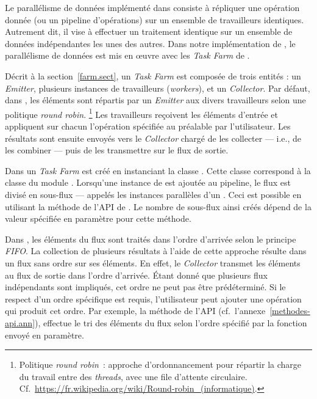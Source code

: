Le parall\'elisme de donn\'ees impl\'ement\'e dans   consiste \`a r\'epliquer une op\'eration donnée (ou un pipeline d'opérations) sur un ensemble de travailleurs identiques. Autrement dit, il vise \`a effectuer un traitement identique sur un ensemble de donn\'ees ind\'ependantes les unes des autres. 
%
Dans notre impl\'ementation de \PpFf, le parall\'elisme de donn\'ees est mis en \oe{}uvre avec les \emph{Task Farm} de .


D\'ecrit \`a la section~\ref{farm.sect}, un \emph{Task Farm} est compos\'ee de trois entit\'es : un \emph{Emitter}, plusieurs instances de travailleurs (\emph{workers}), et un \emph{Collector}. Par d\'efaut, dans \PpFf{}, les \'el\'ements sont r\'epartis par un \emph{Emitter} aux divers travailleurs selon une politique \emph{round robin}.%
%
\footnote{Politique \emph{round robin}~: approche d'ordonnancement pour r\'epartir la charge du travail entre des \emph{threads}, avec une file d'attente circulaire. Cf.~\url{https://fr.wikipedia.org/wiki/Round-robin_(informatique)}.} 
%
Les travailleurs re\c{c}oivent les \'el\'ements d'entr\'ee et appliquent sur chacun l'op\'eration sp\'ecifi\'ee au pr\'ealable par l'utilisateur. Les r\'esultats sont ensuite envoy\'es vers le \emph{Collector} charg\'e de les collecter --- i.e., de les combiner --- puis de les transmettre sur le flux de sortie.

Dans  un \emph{Task Farm} est cr\'e\'e en instanciant la classe . Cette classe correspond \`a la classe  du module . Lorsqu'une instance de  est ajout\'ee au {pipeline}, le flux est divis\'e en sous-flux --- appel\'es les instances parall\`eles d'un . Ceci est possible en utilisant la m\'ethode  de l'API de . Le nombre de sous-flux ainsi cr\'e\'es d\'epend de la valeur sp\'ecifi\'ee en param\`etre pour cette m\'ethode.  

Dans , les \'el\'ements du flux sont trait\'es dans l'ordre d'arriv\'ee selon le principe \emph{FIFO}. La collection de plusieurs r\'esultats \`a l'aide de cette approche r\'esulte dans un flux sans ordre sur ses \'el\'ements. En effet, le \emph{Collector} transmet les \'el\'ements au flux de sortie dans l'ordre d'arriv\'ee. \'Etant donn\'e que plusieurs flux ind\'ependants sont impliqu\'es, cet ordre ne peut pas \^etre pr\'ed\'etermin\'e. Si le respect d'un  ordre sp\'ecifique est requis, l'utilisateur peut ajouter une op\'eration qui produit cet ordre. Par exemple, la m\'ethode  de l'API (cf.~l'annexe~\ref{methodes-api.ann}), effectue le tri des \'el\'ements du flux selon l'ordre sp\'ecifi\'e par la fonction  envoy\'e en param\`etre.

